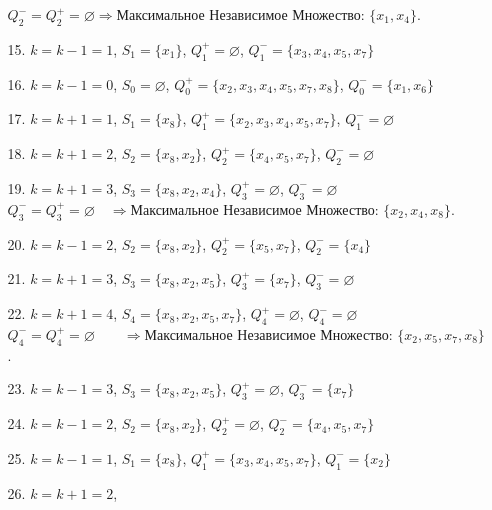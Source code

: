 \documentclass{article}
\begin{document}
\begin{enumerate}
\begin{enumerate}
        $Q_2^{-} = Q_2^{+} = \varnothing \Longrightarrow \textbf{Максимальное Независимое Множество: }\{x_1, x_4\}$.
    \item[15.] $k = k - 1 = 1$,
        \quad $S_1 =\{x_1\}$,
        \quad  $Q_1^{+} =\varnothing$,
        \quad  $Q_1^{-} = \{x_3,x_4,x_5,x_7\}$
    \item[16.] $k = k - 1 = 0$,
        \quad $S_0 =\varnothing$,
        \quad  $Q_0^{+} =\{x_2,x_3,x_4,x_5,x_7,x_8\}$,
        \quad  $Q_0^{-} = \{x_1,x_6\}$
    \item[17.] $k = k + 1 = 1$,
        \quad $S_1 =\{x_8\}$,
        \quad  $Q_1^{+} =\{x_2,x_3,x_4,x_5,x_7\}$,
        \quad  $Q_1^{-} = \varnothing$
    \item[18.] $k = k + 1 = 2$,
        \quad $S_2 =\{x_8, x_2\}$,
        \quad  $Q_2^{+} =\{x_4,x_5,x_7\}$,
        \quad  $Q_2^{-} = \varnothing$
    \item[19.] $k = k + 1 = 3$,
        \quad $S_3 =\{x_8,x_2, x_4\}$,
        \quad  $Q_3^{+} =\varnothing$,
        \quad  $Q_3^{-} = \varnothing$\\
        $Q_3^{-} = Q_3^{+} = \varnothing\quad\Longrightarrow \textbf{Максимальное Независимое Множество: }\{x_2, x_4,x_8\}$.
    \item[20.] $k = k - 1 = 2$,
        \quad $S_2 =\{x_8,x_2\}$,
        \quad  $Q_2^{+} =\{x_5,x_7\}$,
        \quad  $Q_2^{-} = \{x_4\}$
    \item[21.] $k = k + 1 = 3$,
        \quad $S_3 =\{x_8,x_2, x_5\}$,
        \quad  $Q_3^{+} =\{x_7\}$,
        \quad  $Q_3^{-} = \varnothing$
    \item[22.] $k = k + 1 = 4$,
        \quad $S_4 =\{x_8,x_2, x_5,x_7\}$,
        \quad  $Q_4^{+} =\varnothing$,
        \quad  $Q_4^{-} = \varnothing$\\
        $Q_4^{-} = Q_4^{+} = \varnothing\qquad\Longrightarrow \textbf{Максимальное Независимое Множество: }\{x_2, x_5,x_7,x_8\}$.
    \item[23.] $k = k - 1 = 3$,
        \quad $S_3 =\{x_8,x_2, x_5\}$,
        \quad  $Q_3^{+} =\varnothing$,
        \quad  $Q_3^{-} = \{x_7\}$
    \item[24.] $k = k - 1 = 2$,
        \quad $S_2 =\{x_8,x_2\}$,
        \quad  $Q_2^{+} =\varnothing$,
        \quad  $Q_2^{-} = \{x_4,x_5,x_7\}$
    \item[25.] $k = k - 1 = 1$,
        \quad $S_1 =\{x_8\}$,
        \quad  $Q_1^{+} =\{x_3,x_4,x_5,x_7\}$,
        \quad  $Q_1^{-} = \{x_2\}$
    \item[26.] $k = k + 1 = 2$,

\end{enumerate}
\end{enumerate}
\end{document}

